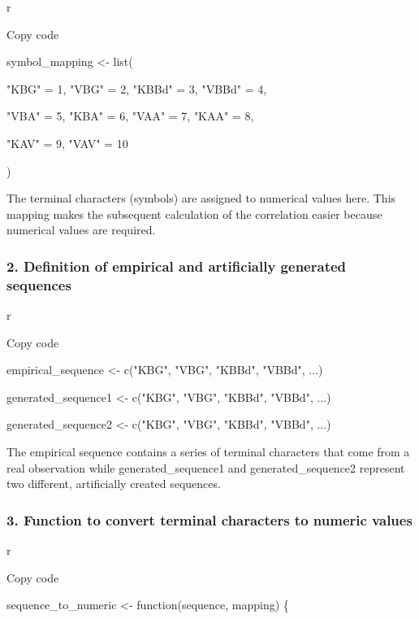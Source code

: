 \documentclass[
]{article}
\begin{document}
r

Copy code

symbol\_mapping \textless- list(

"KBG" = 1, "VBG" = 2, "KBBd" = 3, "VBBd" = 4,

"VBA" = 5, "KBA" = 6, "VAA" = 7, "KAA" = 8,

"KAV" = 9, "VAV" = 10

)

The terminal characters (symbols) are assigned to numerical values
\hspace{0pt}\hspace{0pt}here. This mapping makes the subsequent
calculation of the correlation easier because numerical values
\hspace{0pt}\hspace{0pt}are required.

\subsubsection{\texorpdfstring{\textbf{2. Definition of empirical and
artificially generated
sequences}}{2. Definition of empirical and artificially generated sequences}}\label{definition-of-empirical-and-artificially-generated-sequences}

r

Copy code

empirical\_sequence \textless- c("KBG", "VBG", "KBBd", "VBBd", ...)

generated\_sequence1 \textless- c("KBG", "VBG", "KBBd", "VBBd", ...)

generated\_sequence2 \textless- c("KBG", "VBG", "KBBd", "VBBd", ...)

The empirical sequence contains a series of terminal characters that
come from a real observation while generated\_sequence1 and
generated\_sequence2 represent two different, artificially created
sequences.

\subsubsection{\texorpdfstring{\textbf{3. Function to convert terminal
characters to numeric
values}}{3. Function to convert terminal characters to numeric values}}\label{function-to-convert-terminal-characters-to-numeric-values}

r

Copy code

sequence\_to\_numeric \textless- function(sequence, mapping) \{
\end{document}
